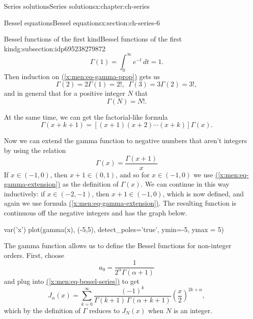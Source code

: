\documentclass[oneside,10pt,]{book}
\newcommand{\xreffont}{\relax}
\numberwithin{equation}{section}
\numberwithin{equation}{section}
\begin{document}
\begin{chapterptx}{Series solutions}{}{Series solutions}{}{}{x:chapter:ch-series}
\begin{sectionptx}{Bessel equations}{}{Bessel equations}{}{}{x:section:ch-series-6}
\begin{subsectionptx}{Bessel functions of the first kind}{}{Bessel functions of the first kind}{}{}{g:subsection:idp695238279872}
\begin{equation*}
\Gamma(1) = \int_0^\infty e^{-t} \, dt = 1.
\end{equation*}
Then induction on \hyperref[x:men:eq-gamma-prop]{({\xreffont\ref{x:men:eq-gamma-prop}})} gets us%
\begin{equation*}
\Gamma(2) = 2\Gamma(1) = 2!, \,\,\, \Gamma(3) = 3\Gamma(2) = 3!,
\end{equation*}
and in general that for a positive integer \(N\) that%
\begin{equation*}
\Gamma(N) = N!.
\end{equation*}
%
\par
At the same time, we can get the factorial-like formula%
\begin{equation}
\Gamma(x + k + 1) = [(x+1)(x+2)\cdots(x+k)] \Gamma(x).\label{x:men:eq-gamma-factorial-like}
\end{equation}
%
\par
Now we can extend the gamma function to negative numbers that aren't integers by using the relation%
\begin{equation}
\Gamma(x) = \frac{\Gamma(x+1)}{x}\label{x:men:eq-gamma-extension}
\end{equation}
If \(x \in (-1,0)\), then \(x + 1 \in (0,1)\), and so for \(x \in (-1,0)\) we use \hyperref[x:men:eq-gamma-extension]{({\xreffont\ref{x:men:eq-gamma-extension}})} as the definition of \(\Gamma(x)\). We can continue in this way inductively: if \(x \in (-2,-1)\), then \(x+ 1 \in (-1,0)\), which is now defined, and again we use formula \hyperref[x:men:eq-gamma-extension]{({\xreffont\ref{x:men:eq-gamma-extension}})}. The resulting function is continuous off the negative integers and has the graph below.%
\begin{sageinput}
var('x')
plot(gamma(x), (-5,5), detect_poles='true', ymin=-5, ymax = 5)
\end{sageinput}
The gamma function allows us to define the Bessel functions for non-integer orders. First, choose%
\begin{equation*}
a_0 = \frac{1}{2^\alpha \Gamma(\alpha + 1)}
\end{equation*}
and plug into \hyperref[x:men:eq-bessel-series]{({\xreffont\ref{x:men:eq-bessel-series}})} to get%
\begin{equation}
J_\alpha(x) = \sum_{k=0}^\infty \frac{(-1)^k}{\Gamma(k+1) \, \Gamma(\alpha + k + 1)} \left(\frac{x}{2}\right)^{2k + \alpha},\label{x:men:eq-bessel-first}
\end{equation}
which by the definition of \(\Gamma\) reduces to \(J_N(x)\) when \(N\) is an integer.%

\end{subsectionptx}
\end{sectionptx}
\end{chapterptx}
\end{document}
